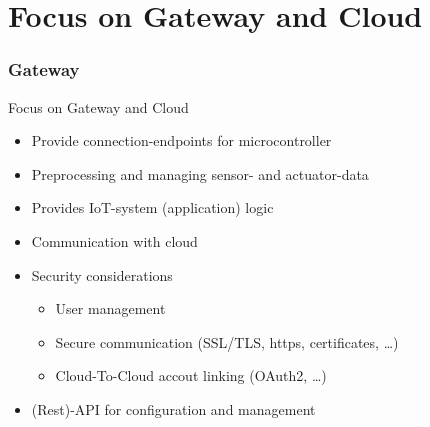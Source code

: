 ﻿\part{Focus on Gateway and Cloud}
\section{Gateway}

\begin{frame}{Focus on Gateway and Cloud}
  \begin{description}[Gateway]
    \item[Gateway]
    \begin{itemize}
      \item Provide connection-endpoints for microcontroller
      \item Preprocessing and managing sensor- and actuator-data
      \item Provides IoT-system (application) logic
      \item Communication with cloud
      \item Security considerations
      \begin{itemize}
        \item User management
        \item Secure communication (SSL/TLS, https, certificates, \ldots)
        \item Cloud-To-Cloud accout linking (OAuth2, \ldots)
      \end{itemize}
      \item (Rest)-API for configuration and management
    \end{itemize}
  \end{description}
\end{frame}
